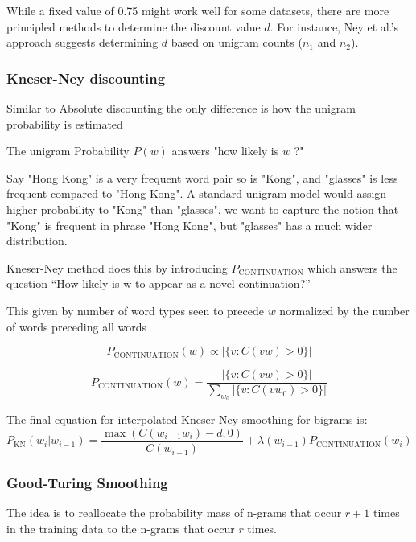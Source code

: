 \documentclass[12pt]{article}
\begin{document}
            While a fixed value of 0.75 might work well for some datasets, there are more principled methods to determine the discount value $d$. For instance, Ney et al.'s approach suggests determining $d$ based on unigram counts ($n_1$ and $n_2$).
        
        \subsubsection{Kneser-Ney discounting}
            Similar to Absolute discounting the only difference is how the unigram probability is estimated
            
            The unigram Probability $P(w)$ answers "how likely is $w$ ?"

            Say "Hong Kong" is a very frequent word pair so is "Kong", and "glasses" is less frequent compared to "Hong Kong".
            A standard unigram model would assign higher probability to "Kong" than "glasses", we want to capture the notion that
             "Kong" is frequent in phrase "Hong Kong", but "glasses" has a much wider distribution.
             
           Kneser-Ney method does this by introducing $P_{\text{CONTINUATION}}$  which
           answers the question “How likely is w to appear as a novel continuation?”

           This given by number of word types seen to precede $w$ normalized by the number of words preceding all words
           
            \begin{equation}
                P_{\text{CONTINUATION}}(w) \propto |\{v : C(vw) > 0\}|
            \end{equation}

            \begin{equation}
                P_{\text{CONTINUATION}}(w) = \frac{|\{v : C(vw) > 0\}|}{\sum_{w_0} |\{v : C(vw_0) > 0\}|}
            \end{equation}
            
            The final equation for interpolated Kneser-Ney smoothing for bigrams is:
            \begin{equation}
                P_{\text{KN}}(w_i | w_{i-1}) = \frac{\max(C(w_{i-1}w_i) - d, 0)}{C(w_{i-1})} + \lambda(w_{i-1})P_{\text{CONTINUATION}}(w_i)
            \end{equation}
        
        \subsubsection{Good-Turing Smoothing}
            The idea is to reallocate the probability mass of n-grams that occur $r+ 1$ times in the training data to the n-grams that occur $r$ times.
            
\end{document}

